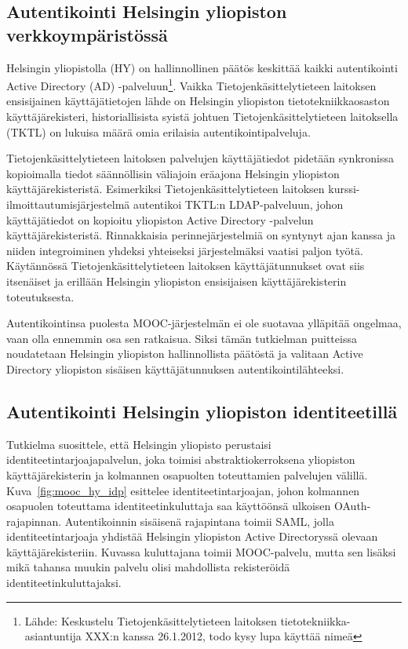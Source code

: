 \documentclass[finnish,gradu]{tktltiki}
\begin{document}


  \subsection{Autentikointi Helsingin yliopiston verkkoympäristössä} %
  \label{sub:autentikointi_helsingin_yliopiston_verkkoympäristössä}

  Helsingin yliopistolla (HY) on hallinnollinen päätös keskittää kaikki autentikointi Active Directory (AD) -palveluun\footnote{Lähde: Keskustelu Tietojenkäsittelytieteen laitoksen tietotekniikka-asiantuntija XXX:n kanssa 26.1.2012, todo kysy lupa käyttää nimeä}. Vaikka Tietojenkäsittelytieteen laitoksen ensisijainen käyttäjätietojen lähde on Helsingin yliopiston tietotekniikkaosaston käyttäjärekisteri, historiallisista syistä johtuen Tietojenkäsittelytieteen laitoksella (TKTL) on lukuisa määrä omia erilaisia autentikointipalveluja.

  Tietojenkäsittelytieteen laitoksen palvelujen käyttäjätiedot pidetään synkronissa kopioimalla tiedot säännöllisin väliajoin eräajona Helsingin yliopiston käyttäjärekisteristä. Esimerkiksi Tietojenkäsittelytieteen laitoksen kurssi-ilmoittautumisjärjestelmä autentikoi TKTL:n LDAP-palveluun, johon käyttäjätiedot on kopioitu yliopiston Active Directory -palvelun käyttäjärekisteristä. Rinnakkaisia perinnejärjestelmiä on syntynyt ajan kanssa ja niiden integroiminen yhdeksi yhteiseksi järjestelmäksi vaatisi paljon työtä. Käytännössä Tietojenkäsittelytieteen laitoksen käyttäjätunnukset ovat siis itsenäiset ja erillään Helsingin yliopiston ensisijaisen käyttäjärekisterin toteutuksesta.

  Autentikointinsa puolesta MOOC-järjestelmän ei ole suotavaa ylläpitää ongelmaa, vaan olla ennemmin osa sen ratkaisua. Siksi tämän tutkielman puitteissa noudatetaan Helsingin yliopiston hallinnollista päätöstä ja valitaan Active Directory yliopiston sisäisen käyttäjätunnuksen autentikointilähteeksi.

  \subsection{Autentikointi Helsingin yliopiston identiteetillä} %
  \label{sub:autentikointi_helsingin_yliopiston_identiteetillä}

  Tutkielma suosittele, että Helsingin yliopisto perustaisi identiteetintarjoajapalvelun, joka toimisi abstraktiokerroksena yliopiston käyttäjärekisterin ja kolmannen osapuolten toteuttamien palvelujen välillä.  Kuva~\ref{fig:mooc_hy_idp} esittelee identiteetintarjoajan, johon kolmannen osapuolen toteuttama identiteetinkuluttaja saa käyttöönsä ulkoisen OAuth-rajapinnan. Autentikoinnin sisäisenä rajapintana toimii SAML, jolla identiteetintarjoaja yhdistää Helsingin yliopiston Active Directoryssä olevaan käyttäjärekisteriin. Kuvassa kuluttajana toimii MOOC-palvelu, mutta sen lisäksi mikä tahansa muukin palvelu olisi mahdollista rekisteröidä identiteetinkuluttajaksi.
\end{document}
